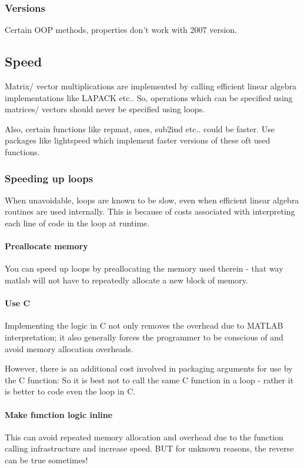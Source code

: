 \documentclass[oneside, article]{memoir}
\begin{document}
\subsubsection{Versions}
Certain OOP methods, properties don't work with 2007 version.

\subsection{Speed}
Matrix/ vector multiplications are implemented by calling efficient linear algebra implementations like LAPACK etc.. So, operations which can be specified using matrices/ vectors should never be specified using loops.

Also, certain functions like repmat, ones, sub2ind etc.. could be faster. Use packages like lightspeed which implement faster versions of these oft used functions.

\subsubsection{Speeding up loops}
When unavoidable, loops are known to be slow, even when efficient linear algebra routines are used internally. This is because of costs associated with interpreting each line of code in the loop at runtime.

\paragraph{Preallocate memory}
You can speed up loops by preallocating the memory used therein - that way matlab will not have to repeatedly allocate a new block of memory.

\paragraph{Use C}
Implementing the logic in C not only removes the overhead due to MATLAB interpretation; it also generally forces the programmer to be conscious of and avoid memory allocation overheads.

However, there is an additional cost involved in packaging arguments for use by the C function: So it is best not to call the same C function in a loop - rather it is better to code even the loop in C.

\paragraph{Make function logic inline}
This can avoid repeated memory allocation and overhead due to the function calling infrastructure and increase speed. BUT for unknown reasons, the reverse can be true sometimes!
\end{document}

